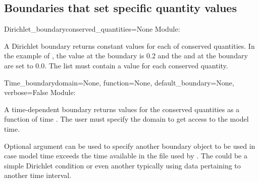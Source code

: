 \documentclass{manual}
\begin{document}
\subsection{Boundaries that set specific quantity values}

\begin{classdesc}{Dirichlet_boundary}{conserved_quantities=None}
Module: 

A Dirichlet boundary returns constant values for each of conserved
quantities. In the example of ,
the  value at the boundary is 0.2 and the  and
 at the boundary are set to 0.0. The list must contain
a value for each conserved quantity.
\end{classdesc}




\begin{classdesc}{Time_boundary}{domain=None,
                                 function=None,
                                 default_boundary=None,
                                 verbose=False}
Module: 

A time-dependent boundary returns values for the conserved
quantities as a function of time . The user must specify
the domain to get access to the model time.

Optional argument  can be used to specify another boundary object
to be used in case model time exceeds the time available in the file used by .
The  could be a simple Dirichlet condition or
even another  typically using data pertaining to another time interval.
\end{classdesc}
\end{document}

